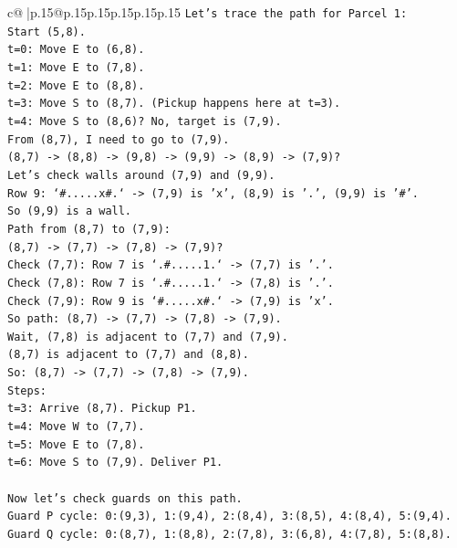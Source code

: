 \documentclass{article}
\begin{document}
{\begin{supertabular}{c@{$\;$}|p{.15\linewidth}@{}p{.15\linewidth}p{.15\linewidth}p{.15\linewidth}p{.15\linewidth}p{.15\linewidth}}
{{{\texttt{Let's trace the path for Parcel 1:} \\
\texttt{Start (5,8).} \\
\texttt{t=0: Move E to (6,8).} \\
\texttt{t=1: Move E to (7,8).} \\
\texttt{t=2: Move E to (8,8).} \\
\texttt{t=3: Move S to (8,7). (Pickup happens here at t=3).} \\
\texttt{t=4: Move S to (8,6)? No, target is (7,9).} \\
\texttt{From (8,7), I need to go to (7,9).} \\
\texttt{(8,7) {-}> (8,8) {-}> (9,8) {-}> (9,9) {-}> (8,9) {-}> (7,9)?} \\
\texttt{Let's check walls around (7,9) and (9,9).} \\
\texttt{Row 9: `\#.....x\#.` {-}> (7,9) is 'x', (8,9) is '.', (9,9) is '\#'.} \\
\texttt{So (9,9) is a wall.} \\
\texttt{Path from (8,7) to (7,9):} \\
\texttt{(8,7) {-}> (7,7) {-}> (7,8) {-}> (7,9)?} \\
\texttt{Check (7,7): Row 7 is `.\#.....1.` {-}> (7,7) is '.'.} \\
\texttt{Check (7,8): Row 7 is `.\#.....1.` {-}> (7,8) is '.'.} \\
\texttt{Check (7,9): Row 9 is `\#.....x\#.` {-}> (7,9) is 'x'.} \\
\texttt{So path: (8,7) {-}> (7,7) {-}> (7,8) {-}> (7,9).} \\
\texttt{Wait, (7,8) is adjacent to (7,7) and (7,9).} \\
\texttt{(8,7) is adjacent to (7,7) and (8,8).} \\
\texttt{So: (8,7) {-}> (7,7) {-}> (7,8) {-}> (7,9).} \\
\texttt{Steps:} \\
\texttt{t=3: Arrive (8,7). Pickup P1.} \\
\texttt{t=4: Move W to (7,7).} \\
\texttt{t=5: Move E to (7,8).} \\
\texttt{t=6: Move S to (7,9). Deliver P1.} \\
\\ 
\texttt{Now let's check guards on this path.} \\
\texttt{Guard P cycle: 0:(9,3), 1:(9,4), 2:(8,4), 3:(8,5), 4:(8,4), 5:(9,4).} \\
\texttt{Guard Q cycle: 0:(8,7), 1:(8,8), 2:(7,8), 3:(6,8), 4:(7,8), 5:(8,8).} \\
}}}
\end{supertabular}}
\end{document}
